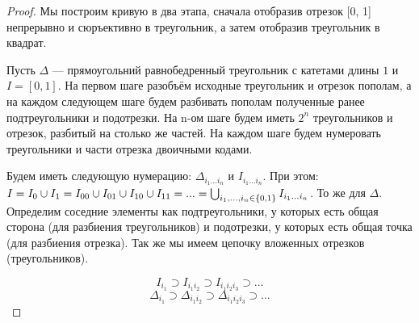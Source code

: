 \begin{proof}
    Мы построим кривую в два этапа, сначала отобразив отрезок [0, 1] непрерывно и сюръективно в треугольник, а затем отобразив треугольник в квадрат.
    \begin{center}
        

    \end{center}
    

    Пусть $\Delta$ --- прямоугольний равнобедренный треугольник с катетами длины $1$ и $I = [0,1]$. На первом шаге разобъём исходные треугольник и отрезок пополам, а на каждом следующем шаге будем разбивать пополам полученные ранее подтреугольники и подотрезки. На n-ом шаге будем иметь $2^n$ треугольников и отрезок, разбитый на столько же частей. На каждом шаге будем нумеровать треугольники и части отрезка двоичными кодами. 
    
    Будем иметь следующую нумерацию: $\Delta_{i_1 \ldots i_n}$ и $I_{i_1 \ldots i_n}$. При этом: $I = I_0 \cup I_1 = I_{00} \cup I_{01} \cup I_{10} \cup I_{11} = ... = \bigcup_{i_1, \ldots, i_n \in \left\{0,1\right\}} I_{i_1 \ldots i_n}$. То же для $\Delta$.
    Определим соседние элементы как подтреугольники, у которых есть общая сторона (для разбиения треугольников) и подотрезки, у которых есть общая точка (для разбиения отрезка).
    Так же мы имеем цепочку вложенных отрезков (треугольников).

    \[
        I_{i_1} \supset I_{i_1 i_2} \supset I_{i_1 i_2 i_3} \supset \ldots
    \]
    \[
        \Delta_{i_1} \supset \Delta_{i_1 i_2} \supset \Delta_{i_1 i_2 i_3} \supset \ldots
    \]


\end{proof}

